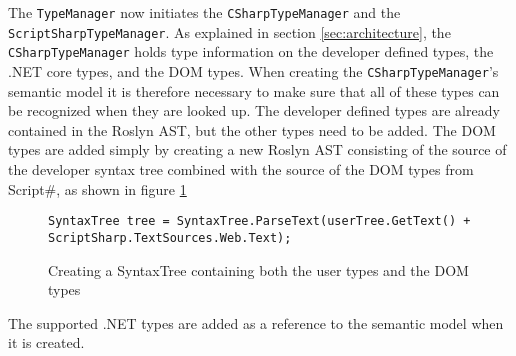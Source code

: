 
The \texttt{TypeManager} now initiates the \texttt{CSharpTypeManager} and the \newline\texttt{ScriptSharpTypeManager}. As explained in section \ref{sec:architecture}, the \texttt{CSharpTypeManager} holds type information on the developer defined types, the .NET core types, and the DOM types.
 When creating the \texttt{CSharpTypeManager}'s semantic model it is therefore necessary to make sure that all of these types can be recognized when they are looked up. The developer defined types are already contained in the Roslyn AST, but the other types need to be added. The DOM types are added simply by creating a new Roslyn AST consisting of the source of the developer syntax tree combined with the source of the DOM types from Script\#, as shown in figure \ref{fig:init_mics_add_dom_types}

\begin{figure}[H]
\begin{lstlisting}[language=CSharp,classoffset=1,morekeywords={SyntaxTree}]
SyntaxTree tree = SyntaxTree.ParseText(userTree.GetText() + ScriptSharp.TextSources.Web.Text);
\end{lstlisting}
\caption{Creating a SyntaxTree containing both the user types and the DOM types}
\label{fig:init_mics_add_dom_types}
\end{figure}

The supported .NET types are added as a reference to the semantic model when it is created.





